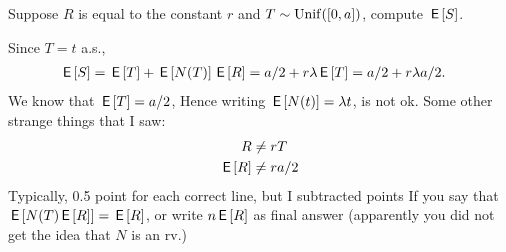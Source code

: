 \begin{exercise}[2]
  Suppose $R$ is equal to the constant $r$ and $T\sim\mathrm{Unif}([0, a])$, compute $\,\mathsf{E}\left[S\right]$.
\begin{solution}
    Since $T=t$ a.s.,
    \begin{align*}
      \,\mathsf{E}\left[S\right] &= \,\mathsf{E}\left[T\right]  + \,\mathsf{E}\left[N(T)\right]\,\mathsf{E}\left[R\right]= a/2+ r \lambda \,\mathsf{E}\left[T\right] = a/2 + r \lambda a/2.
    \end{align*}
We know that $\,\mathsf{E}\left[T\right] = a/2$, Hence writing $\,\mathsf{E}\left[N(t)\right] = \lambda t$, is not ok. Some other strange things that I saw:
\begin{align}
 R &\neq r T\\
\,\mathsf{E}\left[R\right] &\neq ra/2\\
\end{align}
Typically, 0.5 point for each correct line, but I subtracted points If you say that $\,\mathsf{E}\left[N(T) \,\mathsf{E}\left[R\right]\right] = \,\mathsf{E}\left[R\right]$, or write $n\,\mathsf{E}\left[R\right]$ as final answer (apparently you did not get the idea that $N$ is an rv.)
\end{solution}
\end{exercise}



